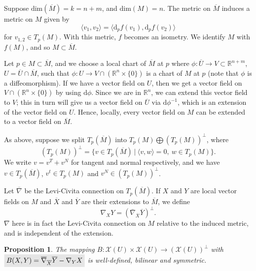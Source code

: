 \documentclass[letter-paper]{tufte-book}
\newtheorem{proposition}[theorem]{\color{pastel-blue}Proposition}
\newcommand{\highlight}[1]{\mathchoice%
  {\colorbox{black!10}{$\displaystyle#1$}}%
  {\colorbox{black!10}{$\textstyle#1$}}%
  {\colorbox{black!10}{$\scriptstyle#1$}}%
  {\colorbox{black!10}{$\scriptscriptstyle#1$}}}%
\begin{document}
Suppose $\mbox{dim}(\overline{M}) = k = n+m$, and $\mbox{dim}(M) = n$. The metric on $\overline{M}$ induces a metric on $M$ given by
\begin{equation}
  \langle v_1, v_2\rangle = \langle \mathrm{d}_p f(v_1), \mathrm{d}_p f(v_2)\rangle
\end{equation}
for $v_{1,2}\in T_p(M)$. With this metric, $f$ becomes an isometry. We identify $M$ with $f(M)$, and so $M \subset \overline{M}$.

Let $p\in M \subset \overline{M}$, and we choose a local chart of $\overline{M}$ at $p$ where $\phi : \overline{U} \to V\subset \mathbb{R}^{n+m}$, $U = \overline{U} \cap \overline{M}$, such that $\phi: U\to V \cap (\mathbb{R}^n \times \{0\})$ is a chart of $M$ at $p$ (note that $\phi$ is a diffeomorphism). If we have a vector field on $U$, then we get a vector field on $V \cap (\mathbb{R}^n \times \{0\})$ by using $\mathrm{d}\phi$. Since we are in $\mathbb{R}^n$, we can extend this vector field to $V$; this in turn will give us a vector field on $\overline{U}$ via $\mathrm{d}\phi^{-1}$, which is an extension of the vector field on $U$. Hence, locally, every vector field on $M$ can be extended to a vector field on $\overline{M}$.

As above, suppose we split $T_p(\overline{M})$ into $T_p(M) \bigoplus (T_p(M))^\perp$, where
\begin{equation}
  (T_p(M))^\perp = \{ v\in T_p(\overline{M})\ |\ \langle v,w\rangle=0,\ w\in T_p(M)\}.
\end{equation}
We write $v= v^T + v^N$ for tangent and normal respectively, and we have $v\in T_p(\overline{M})$, $v^t\in T_p(M)$ and $v^N \in (T_p(M))^\perp$.

Let $\overline{\nabla}$ be the Levi-Civita connection on $T_p(\overline{M})$. If $X$ and $Y$ are local vector fields on $M$ and $\overline{X}$ and $\overline{Y}$ are their extensions to $\overline{M}$, we define
\begin{equation}
  \nabla_X Y = \left(\overline{\nabla}_{\overline{X}}\overline{Y}\right)^\perp.
\end{equation}
$\nabla$ here is in fact the Levi-Civita connection on $M$ relative to the induced metric, and is independent of the extension.

\begin{proposition}
  The mapping $B:\mathcal{X}(U) \times \mathcal{X}(U) \to (\mathcal{X}(U))^\perp$ with $\highlight{B(X,Y) = \overline{\nabla}_{\overline{X}}\overline{Y} - \nabla_Y X}$ is well-defined, bilinear and symmetric.
\end{proposition}
\end{document}
